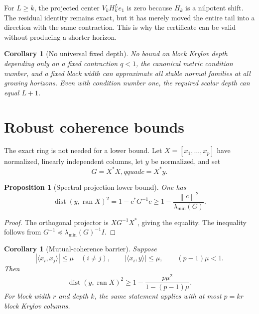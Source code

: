 \documentclass[11pt]{article}
\newtheorem{proposition}[theorem]{Proposition}
\newtheorem{corollary}[theorem]{Corollary}
\newcommand{\norm}[1]{\left\lVert#1\right\rVert}
\newcommand{\dist}{\operatorname{dist}}
\begin{document}
For $L\ge k$, the projected center $V_kH_k^L e_1$ is zero because $H_k$ is a
nilpotent shift.  The residual identity remains exact, but it has merely moved
the entire tail into a direction with the same contraction.  This is why the
certificate can be valid without producing a shorter horizon.

\begin{corollary}[No universal fixed depth]
\label{cor:no-go}
No bound on block Krylov depth depending only on a fixed contraction
$q<1$, the canonical metric condition number, and a fixed block width can
approximate all stable normal families at all growing horizons.  Even with
condition number one, the required scalar depth can equal $L+1$.
\end{corollary}

\section{Robust coherence bounds}
\label{sec:coherence}

The exact ring is not needed for a lower bound.  Let
$X=[x_1,\ldots,x_p]$ have normalized, linearly independent columns, let
$y$ be normalized, and set
\begin{equation}
 G=X^*X,qquad c=X^*y.
 \label{eq:gram-correlation}
\end{equation}

\begin{proposition}[Spectral projection lower bound]
\label{prop:spectral}
One has
\begin{equation}
 \dist(y,\operatorname{ran}X)^2
 =1-c^*G^{-1}c
 \ge1-\frac{\norm c^2}{\lambda_{\min}(G)}.
 \label{eq:spectral-lower}
\end{equation}
\end{proposition}

\begin{proof}
The orthogonal projector is $XG^{-1}X^*$, giving the equality.  The
inequality follows from $G^{-1}\preceq\lambda_{\min}(G)^{-1}I$.
\end{proof}

\begin{corollary}[Mutual-coherence barrier]
\label{cor:coherence}
Suppose
\begin{equation}
 |\langle x_i,x_j\rangle|\le\mu\quad(i\ne j),
 \qquad |\langle x_i,y\rangle|\le\mu,
 \qquad (p-1)\mu<1.
 \label{eq:coherence-assumption}
\end{equation}
Then
\begin{equation}
 \dist(y,\operatorname{ran}X)^2
 \ge1-\frac{p\mu^2}{1-(p-1)\mu}.
 \label{eq:coherence-lower}
\end{equation}
For block width $r$ and depth $k$, the same statement applies with at most
$p=kr$ block Krylov columns.
\end{corollary}
\end{document}
